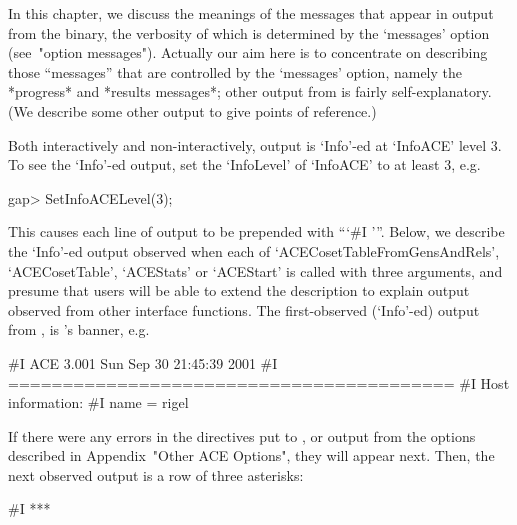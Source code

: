 

In this chapter, we discuss the meanings of the messages  that  appear
in output from the {\ACE} binary, the verbosity of which is determined
by the `messages' option (see~"option  messages").  Actually  our  aim
here is to concentrate  on  describing  those  ``messages''  that  are
controlled  by  the  `messages'  option,  namely  the  *progress*  and
*results   messages*;   other   output   from   {\ACE}    is    fairly
self-explanatory. (We describe some other output  to  give  points  of
reference.)

Both interactively and non-interactively, {\ACE} output  is  `Info'-ed
at `InfoACE' level 3. To see the  `Info'-ed  {\ACE}  output,  set  the
`InfoLevel' of `InfoACE' to at least 3, e.g.

\beginexample
gap> SetInfoACELevel(3);
\endexample

This  causes  each  line  of  {\ACE}  output  to  be  prepended   with
```\#I  '''.  Below,  we describe the `Info'-ed output  observed  when
each of `ACECosetTableFromGensAndRels', `ACECosetTable', `ACEStats' or
`ACEStart' is called with three arguments, and presume that users will
be able to extend the description  to  explain  output  observed  from
other  {\ACE}  interface  functions.  The  first-observed  (`Info'-ed)
output from {\ACE}, is {\ACE}'s banner, e.g.

\begintt
#I  ACE 3.001        Sun Sep 30 21:45:39 2001
#I  =========================================
#I  Host information:
#I    name = rigel
\endtt

If there were any errors in the directives put to  {\ACE},  or  output
from the options described in Appendix~"Other ACE Options", they  will
appear next. Then,  the  next  observed  output  is  a  row  of  three
asterisks:

\begintt
#I  ***
\endtt

